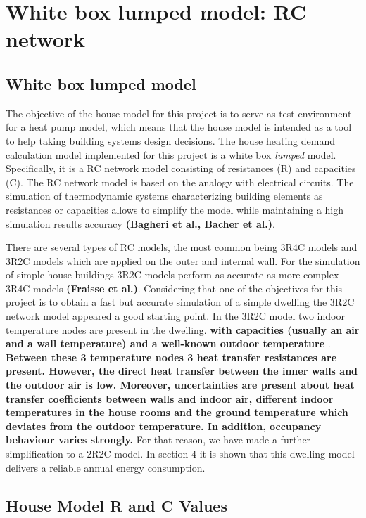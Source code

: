 \section{White box lumped model: RC network}
\subsection{White box lumped model}

The objective of the house model for this project is to serve as test environment for a heat pump model, which means that the house model is intended as a tool to help taking building systems design decisions. The house heating demand calculation model implemented for this project is a white box \emph{lumped} model. Specifically, it is a RC network model consisting of resistances (R) and capacities (C). The RC network model is based on the analogy with electrical circuits. The simulation of thermodynamic systems characterizing building elements as resistances or capacities allows to simplify the model while maintaining a high simulation results accuracy \textbf{(Bagheri et al., Bacher et al.)}.  

There are several types of RC models, the most common being 3R4C models and 3R2C models which are applied on the outer and internal wall. For the simulation of simple house buildings 3R2C models perform as accurate as more complex 3R4C models \textbf{(Fraisse et al.)}. Considering that one of the objectives for this project is to obtain a fast but accurate simulation of a simple dwelling the 3R2C network model appeared a good starting point. In the 3R2C model two indoor temperature nodes are present in the dwelling. \textbf{with capacities (usually an air and a wall temperature) and a well-known outdoor temperature }. \textbf{Between these 3 temperature nodes 3 heat transfer resistances are present. However, the direct heat transfer between the inner walls and the outdoor air is low. Moreover, uncertainties are present about heat transfer coefficients between walls and indoor air, different indoor temperatures in the house rooms and the ground temperature which deviates from the outdoor temperature. In addition, occupancy behaviour varies strongly. }For that reason, we have made a further simplification to a 2R2C model. In section 4 it is shown that this dwelling model delivers a reliable annual energy consumption.


\subsection{House Model R and C Values}

